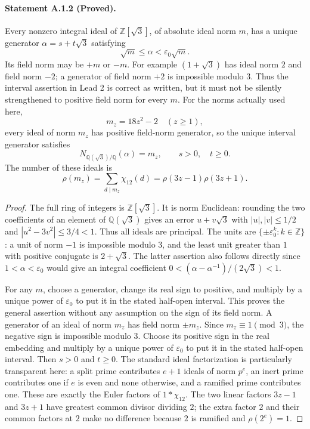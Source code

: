 \paragraph{Statement A.1.2 (Proved).}
Every nonzero integral ideal of $\mathbb Z[\sqrt3]$, of absolute ideal
norm $m$, has a unique generator $\alpha=s+t\sqrt3$ satisfying
\[
 \sqrt m\leq\alpha<\varepsilon_0\sqrt m.
\]
Its field norm may be $+m$ or $-m$. For example $(1+\sqrt3)$ has ideal
norm $2$ and field norm $-2$; a generator of field norm $+2$ is impossible
modulo $3$. Thus the interval assertion in Lead 2 is correct as written,
but it must not be silently strengthened to positive field norm for every
$m$. For the norms actually used here,
\[
 m_z=18z^2-2\quad(z\geq1),
\]
every ideal of norm $m_z$ has positive field-norm generator, so the unique
interval generator satisfies
\[
 N_{\mathbb Q(\sqrt3)/\mathbb Q}(\alpha)=m_z,\qquad s>0,\quad t\geq0.
\]
The number of these ideals is
\[
 \rho(m_z)=\sum_{d\mid m_z}\chi_{12}(d)
          =\rho(3z-1)\rho(3z+1).
\]
\begin{proof}
The full ring of integers is $\mathbb Z[\sqrt3]$. It is norm Euclidean:
rounding the two coefficients of an element of $\mathbb Q(\sqrt3)$ gives
an error $u+v\sqrt3$ with $|u|,|v|\leq1/2$ and
$|u^2-3v^2|\leq3/4<1$. Thus all ideals are principal. The units are
$\{\pm\varepsilon_0^k:k\in\mathbb Z\}$: a unit of norm $-1$ is impossible
modulo $3$, and the least unit greater than $1$ with positive conjugate is
$2+\sqrt3$. The latter assertion also follows directly since
$1<\alpha<\varepsilon_0$ would give an integral coefficient
$0< (\alpha-\alpha^{-1})/(2\sqrt3)<1$.

For any $m$, choose a generator, change its real sign to positive, and
multiply by a unique power of $\varepsilon_0$ to put it in the stated
half-open interval. This proves the general assertion without any
assumption on the sign of its field norm.
A generator of an ideal of norm $m_z$ has field norm $\pm m_z$.
Since $m_z\equiv1\pmod3$, the negative sign is impossible modulo $3$.
Choose its positive sign in the real embedding and multiply by a unique
power of $\varepsilon_0$ to put it in the stated half-open interval.
Then $s>0$ and $t\geq0$. The standard ideal factorization is particularly
transparent here: a split prime contributes $e+1$ ideals of norm $p^e$,
an inert prime contributes one if $e$ is even and none otherwise, and a
ramified prime contributes one. These are exactly the Euler factors of
$1*\chi_{12}$. The two linear factors $3z-1$ and $3z+1$ have greatest common
divisor dividing $2$; the extra factor $2$ and their common factors at $2$
make no difference because $2$ is ramified and $\rho(2^e)=1$.
\end{proof}

